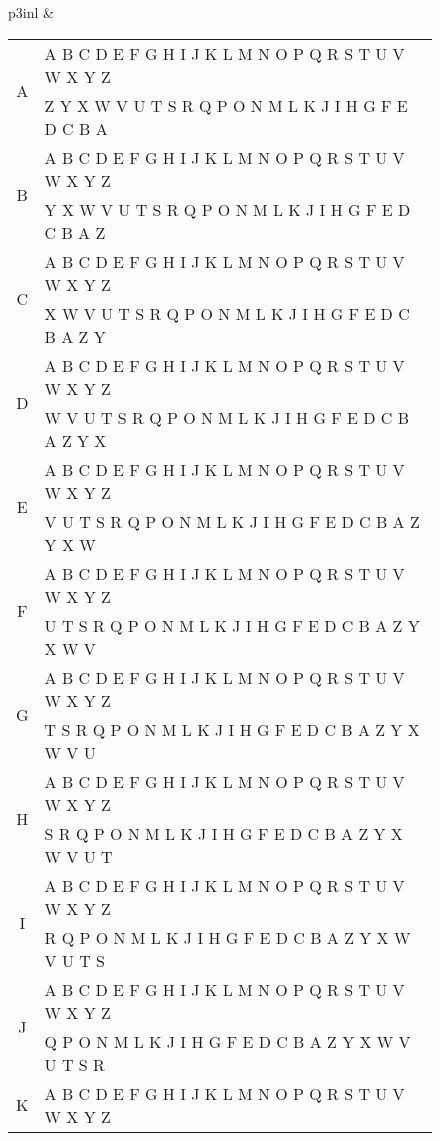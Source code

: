 \documentclass{article}
\begin{document}
\begin{figure}


\begin{tabular}{p{3in}l}
     & {\scriptsize\begin{tabular}{|cl|}\hline
     \multirow{2}{*}{A} & A B C D E F G H I J K L M N O P Q R S T U V W X Y Z  \\
     & Z Y X W V U T S R Q P O N M L K J I H G F E D C B A\\\hline
     \multirow{2}{*}{B} & A B C D E F G H I J K L M N O P Q R S T U V W X Y Z  \\
     & Y X W V U T S R Q P O N M L K J I H G F E D C B A Z\\\hline
     \multirow{2}{*}{C} & A B C D E F G H I J K L M N O P Q R S T U V W X Y Z  \\
     & X W V U T S R Q P O N M L K J I H G F E D C B A Z Y \\\hline
     \multirow{2}{*}{D} & A B C D E F G H I J K L M N O P Q R S T U V W X Y Z  \\
     & W V U T S R Q P O N M L K J I H G F E D C B A Z Y X\\\hline
     \multirow{2}{*}{E} & A B C D E F G H I J K L M N O P Q R S T U V W X Y Z  \\
     & V U T S R Q P O N M L K J I H G F E D C B A Z Y X W\\\hline
     \multirow{2}{*}{F} & A B C D E F G H I J K L M N O P Q R S T U V W X Y Z  \\
     & U T S R Q P O N M L K J I H G F E D C B A Z Y X W V\\\hline
     \multirow{2}{*}{G} & A B C D E F G H I J K L M N O P Q R S T U V W X Y Z  \\
     & T S R Q P O N M L K J I H G F E D C B A Z Y X W V U\\\hline
     \multirow{2}{*}{H} & A B C D E F G H I J K L M N O P Q R S T U V W X Y Z  \\
     & S R Q P O N M L K J I H G F E D C B A Z Y X W V U T\\\hline
     \multirow{2}{*}{I} & A B C D E F G H I J K L M N O P Q R S T U V W X Y Z  \\
     & R Q P O N M L K J I H G F E D C B A Z Y X W V U T S\\\hline
     \multirow{2}{*}{J} & A B C D E F G H I J K L M N O P Q R S T U V W X Y Z  \\
     & Q P O N M L K J I H G F E D C B A Z Y X W V U T S R\\\hline
     \multirow{2}{*}{K} & A B C D E F G H I J K L M N O P Q R S T U V W X Y Z  \\

\end{tabular}}
\end{tabular}
\end{figure}
\end{document}
